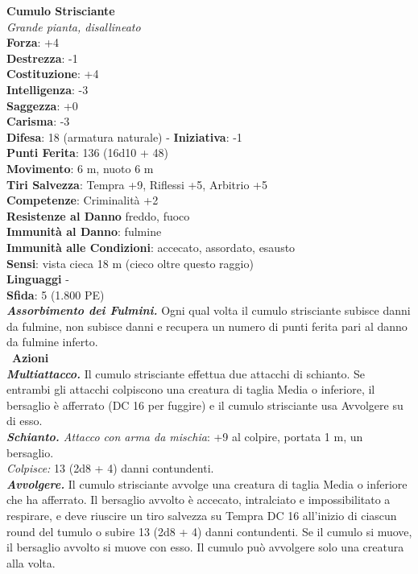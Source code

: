\begin{multicols}{2}
\medskip\textbf{Cumulo Strisciante}\\
\emph{Grande pianta, disallineato}\\
\textbf{Forza}: +4\\
\textbf{Destrezza}: -1\\
\textbf{Costituzione}: +4\\
\textbf{Intelligenza}: -3\\
\textbf{Saggezza}: +0\\
\textbf{Carisma}: -3\\
\textbf{Difesa}: 18 (armatura naturale) - \textbf{Iniziativa}: -1\\
\textbf{Punti Ferita}: 136 (16d10 + 48)\\
\textbf{Movimento}: 6 m, nuoto 6 m\\
\textbf{Tiri Salvezza}: Tempra +9, Riflessi +5, Arbitrio +5\\
\textbf{Competenze}: Criminalità +2\\
\textbf{Resistenze al Danno} freddo, fuoco\\
\textbf{Immunità al Danno}: fulmine\\
\textbf{Immunità alle Condizioni}: accecato, assordato, esausto\\
\textbf{Sensi}: vista cieca 18 m (cieco oltre questo raggio)\\
\textbf{Linguaggi} -\\
\textbf{Sfida}: 5 (1.800 PE)\smallskip\\
\emph{\textbf{Assorbimento dei Fulmini.}} Ogni qual volta il cumulo strisciante subisce danni da fulmine, non subisce danni e recupera un numero di punti ferita pari al danno da fulmine inferto.\\\
\smallskip\textbf{Azioni}\\
\emph{\textbf{Multiattacco.}} Il cumulo strisciante effettua due attacchi di schianto. Se entrambi gli attacchi colpiscono una creatura di taglia Media o inferiore, il bersaglio è afferrato (DC  16 per fuggire) e il cumulo strisciante usa Avvolgere su di esso.\\
\emph{\textbf{Schianto.} Attacco con arma da mischia}: +9 al colpire, portata 1 m, un bersaglio.\\
\emph{Colpisce:} 13 (2d8 + 4) danni contundenti.\\
\emph{\textbf{Avvolgere.}} Il cumulo strisciante avvolge una creatura di taglia Media o inferiore che ha afferrato. Il bersaglio avvolto è accecato, intralciato e impossibilitato a respirare, e deve riuscire un tiro salvezza su Tempra DC  16 all'inizio di ciascun round del tumulo o subire 13 (2d8 + 4) danni contundenti. Se il cumulo si muove, il bersaglio avvolto si muove con esso. Il cumulo può avvolgere solo una creatura alla volta.\\

\end{multicols}
